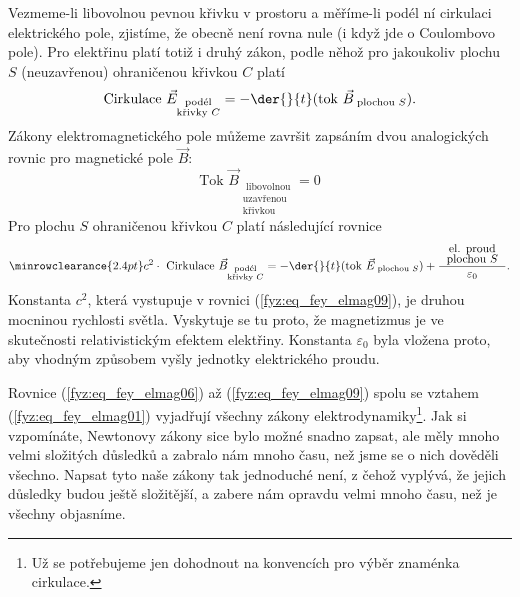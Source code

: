     Vezmeme-li libovolnou pevnou křivku v prostoru a měříme-li podél ní cirkulaci elektrického pole,
    zjistíme, že obecně není rovna nule (i když jde o Coulombovo pole). Pro elektřinu platí totiž i 
    druhý zákon, podle něhož pro jakoukoliv plochu \(S\) (neuzavřenou) ohraničenou křivkou \(C\) 
    platí
    \begin{equation}\label{fyz:eq_fey_elmag07} 
      \text{Cirkulace }\vec{E}_{\substack{\text{podél}\\\text{křivky } C}}
         = -\der{ }{t}(\text{tok }\vec{B}_{\text{ plochou }S}).  
    \end{equation}
    Zákony elektromagnetického pole můžeme završit zapsáním dvou analogických rovnic pro magnetické 
    pole \(\vec{B}\):
    \begin{equation}\label{fyz:eq_fey_elmag08}
      \text{Tok }\vec{B}_{\substack{\text{ libovolnou}\\\text{uzavřenou}\\\text{křivkou}}} = 0  
    \end{equation}
    Pro plochu \(S\) ohraničenou křivkou \(C\) platí následující rovnice
    \begin{gather}\label{fyz:eq_fey_elmag09}
      \renewcommand\arraystretch{0.6} \setlength\minrowclearance{2.4pt}
      c^2\cdot\text{ Cirkulace }\vec{B}_{\substack{\text{podél}\\\text{křivky } C}} =
        - \der{ }{t}(\text{tok }\vec{E}_{\text{ plochou }S})         
        + \frac{
              \begin{array}{c}
                \text{ el. proud }      \\
                \text{plochou } S 
              \end{array}
                }{\varepsilon_0}.	
    \end{gather}
    Konstanta \(c^2\), která vystupuje v rovnici (\ref{fyz:eq_fey_elmag09}), je druhou mocninou 
    rychlosti světla. Vyskytuje se tu proto, že magnetizmus je ve skutečnosti relativistickým 
    efektem elektřiny. Konstanta \(\varepsilon_0\) byla vložena proto, aby vhodným způsobem vyšly 
    jednotky elektrického proudu.        
    
    Rovnice (\ref{fyz:eq_fey_elmag06}) až (\ref{fyz:eq_fey_elmag09}) spolu se vztahem    
    (\ref{fyz:eq_fey_elmag01}) vyjadřují všechny zákony elektrodynamiky\footnote{Už se potřebujeme 
    jen dohodnout na konvencích pro výběr znaménka cirkulace.}. Jak si vzpomínáte, Newtonovy zákony 
    sice bylo možné snadno zapsat, ale měly mnoho velmi složitých důsledků a zabralo nám mnoho 
    času, než jsme se o nich dověděli všechno. Napsat tyto naše zákony tak jednoduché není, z čehož 
    vyplývá, že jejich důsledky budou ještě složitější, a zabere nám opravdu velmi mnoho času, než 
    je všechny objasníme.     
    
